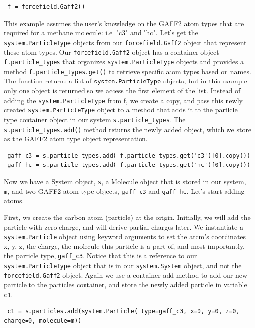 \documentclass[9pt,tutorial]{livecoms}
\begin{document}
\begin{lstlisting}
 f = forcefield.Gaff2()
\end{lstlisting}



This example assumes the user's knowledge on the GAFF2 atom types that are required for a methane molecule: i.e. "c3" and "hc". Let's get the \lstinline$system.ParticleType$ objects from our \lstinline$forcefield.Gaff2$ object that represent these atom types. Our \lstinline$forcefield.Gaff2$ object has a container object \lstinline$f.particle_types$ that organizes \lstinline$system.ParticleType$ objects and provides a method \lstinline$f.particle_types.get()$ to retrieve specific atom types based on names. The function returns a list of \lstinline$system.ParticleType$ objects, but in this example only one object is returned so we access the first element of the list. Instead of adding the \lstinline$system.ParticleType$ from f, we create a copy, and pass this newly created \lstinline$system.ParticleType$ object to a method that adds it to the particle type container object in our system \lstinline$s.particle_types$. The \lstinline$s.particle_types.add()$ method returns the newly added object, which we store as the GAFF2 atom type object representation.

\begin{lstlisting}
 gaff_c3 = s.particle_types.add( f.particle_types.get('c3')[0].copy())
 gaff_hc = s.particle_types.add( f.particle_types.get('hc')[0].copy())
\end{lstlisting}
Now we have a System object, \lstinline$s$, a Molecule object that is stored in our system, \lstinline$m$, and two GAFF2 atom type objects, \lstinline$gaff_c3$ and \lstinline$gaff_hc$. Let's start adding atoms.

First, we create the carbon atom (particle) at the origin. Initially, we will add the particle with zero charge, and will derive partial charges later. We instantiate a \lstinline$system.Particle$ object using keyword arguments to set the atom's coordinates x, y, z, the charge, the molecule this particle is a part of, and most importantly, the particle type, \lstinline$gaff_c3$. Notice that this is a reference to our \lstinline$system.ParticleType$ object that is in our \lstinline$system.System$ object, and not the \lstinline$forcefield.Gaff2$ object. Again we use a container add method to add our new particle to the particles container, and store the newly added particle in variable \lstinline$c1$.

\begin{lstlisting}
 c1 = s.particles.add(system.Particle( type=gaff_c3, x=0, y=0, z=0, charge=0, molecule=m))
\end{lstlisting}
\end{document}
